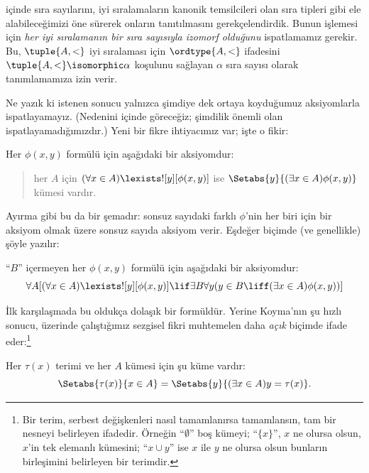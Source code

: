 


 içinde sıra sayılarını, iyi sıralamaların
kanonik temsilcileri olan sıra tipleri gibi ele alabileceğimizi öne sürerek
onların tanıtılmasını gerekçelendirdik. Bunun işlemesi için \emph{her iyi
sıralamanın bir sıra sayısıyla izomorf olduğunu} ispatlamamız gerekir. Bu,
$\tuple{A,<}$ iyi sıralaması için $\ordtype{A,<}$ ifadesini
$\tuple{A,<}\isomorphic\alpha$ koşulunu sağlayan $\alpha$ sıra sayısı
olarak tanımlamamıza izin verir.

Ne yazık ki istenen sonucu yalnızca şimdiye dek ortaya koyduğumuz
aksiyomlarla ispatlayamayız. (Nedenini
 içinde göreceğiz; şimdilik önemli olan
ispatlayamadığımızdır.) Yeni bir fikre ihtiyacımız var; işte o fikir:

\begin{axiom}
Her $\phi(x,y)$ formülü için aşağıdaki bir aksiyomdur:
\begin{quote}
	her $A$ için $(\forall x \in A)\lexists![y][\phi(x,y)]$ ise
	$\Setabs{y}{(\exists x \in A)\phi(x,y)}$ kümesi vardır.
\end{quote}
\end{axiom}
\noindent
Ayırma gibi bu da bir şemadır: sonsuz sayıdaki farklı $\phi$'nin her biri
için bir aksiyom olmak üzere sonsuz sayıda aksiyom verir. Eşdeğer biçimde
(ve genellikle) şöyle yazılır:

\begin{defish}
``$B$'' içermeyen her $\phi(x,y)$ formülü için aşağıdaki bir aksiyomdur:
\[
\forall A[(\forall x \in A)\lexists![y][\phi(x,y)] \lif \exists B\forall y (y \in B \liff (\exists x \in A)\phi(x,y))]
\]
\end{defish}

İlk karşılaşmada bu oldukça dolaşık bir formüldür. Yerine Koyma'nın şu
hızlı sonucu, üzerinde çalıştığımız sezgisel fikri muhtemelen daha
\emph{açık} biçimde ifade eder:\footnote{Bir terim, serbest değişkenleri
nasıl tamamlanırsa tamamlansın, tam bir nesneyi belirleyen ifadedir.
Örneğin ``$\emptyset$'' boş kümeyi; ``$\{x\}$'', $x$ ne olursa olsun,
$x$'in tek elemanlı kümesini; ``$x\cup y$'' ise $x$ ile $y$ ne olursa
olsun bunların birleşimini belirleyen bir terimdir.}

\begin{cor}
Her $\tau(x)$ terimi ve her $A$ kümesi için şu küme vardır:
\[
	\Setabs{\tau(x)}{x \in A} = \Setabs{y}{(\exists x \in A)y = \tau(x)}.
\]
\end{cor}

